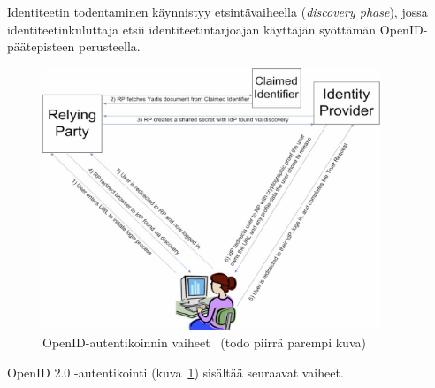 \documentclass[finnish,gradu]{tktltiki}
\begin{document}
  Identiteetin todentaminen käynnistyy etsintävaiheella (\emph{discovery phase}), jossa identiteetinkuluttaja etsii identiteetintarjoajan käyttäjän syöttämän OpenID-päätepisteen perusteella.

  \begin{figure}
    \centering
    \includegraphics[width=0.9\textwidth]{images/openid_flow_recordon06.jpg}
    \caption{OpenID-autentikoinnin vaiheet~\cite{openid_recordon_2009} (todo piirrä parempi kuva)}
    \label{fig:basic_openid_flow}
  \end{figure}

  OpenID 2.0 -autentikointi (kuva~\ref{fig:basic_openid_flow}) sisältää seuraavat vaiheet.
\end{document}
